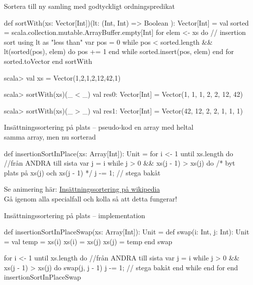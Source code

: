 \begin{Slide}{Sortera till ny samling med godtyckligt ordningspredikat}
\begin{CodeSmall}
def sortWith(xs: Vector[Int])(lt: (Int, Int) => Boolean ): Vector[Int] = 
  val sorted = scala.collection.mutable.ArrayBuffer.empty[Int]
  for elem <- xs do  // insertion sort using lt as "less than"
     var pos = 0
     while pos < sorted.length && lt(sorted(pos), elem) do
       pos += 1
     end while
     sorted.insert(pos, elem)
  end for
  sorted.toVector
end sortWith
\end{CodeSmall}
\pause
\begin{REPL}
scala> val xs = Vector(1,2,1,2,12,42,1)

scala> sortWith(xs)(_ < _)
val res0: Vector[Int] = Vector(1, 1, 1, 2, 2, 12, 42)

scala> sortWith(xs)(_ > _)
val res1: Vector[Int] = Vector(42, 12, 2, 2, 1, 1, 1)
\end{REPL}
\end{Slide}


\begin{Slide}{Insättningssortering på plats -- pseudo-kod}
 en array med heltal\\
 samma array, men nu sorterad\\
\begin{Code}
def insertionSortInPlace(xs: Array[Int]): Unit = 
  for i <- 1 until xs.length do  //från ANDRA till sista
    var j = i
    while j > 0 && xs(j - 1) > xs(j) do
      /* byt plats på xs(j) och xs(j - 1) */
      j -= 1;  // stega bakåt
\end{Code}
\pause
Se animering här: \href{https://sv.wikipedia.org/wiki/Ins\%C3\%A4ttningssortering}{Insättningssortering på wikipedia}\\
Gå igenom alla specialfall och kolla så att detta fungerar!
\end{Slide}

\begin{Slide}{Insättningssortering på plats -- implementation} %
\begin{Code}
def insertionSortInPlaceSwap(xs: Array[Int]): Unit = 
  def swap(i: Int, j: Int): Unit = 
    val temp = xs(i)
    xs(i) = xs(j)
    xs(j) = temp
  end swap 

  for i <- 1 until xs.length do  //från ANDRA till sista
    var j = i
    while j > 0 && xs(j - 1) > xs(j) do
      swap(j, j - 1)
      j -= 1;  // stega bakåt
    end while
  end for
end insertionSortInPlaceSwap
\end{Code}
\end{Slide}

